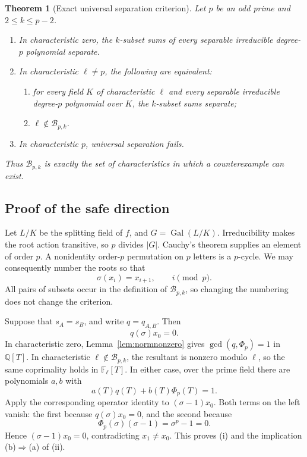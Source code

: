 \documentclass[11pt,a4paper]{article}
\newtheorem{theorem}{Theorem}[section]
\theoremstyle{definition}
\theoremstyle{remark}
\newcommand{\Q}{\mathbb Q}
\newcommand{\F}{\mathbb F}
\newcommand{\Gal}{\operatorname{Gal}}
\begin{document}
\begin{theorem}[Exact universal separation criterion]\label{thm:bad}
Let $p$ be an odd prime and $2\leq k\leq p-2$.
\begin{enumerate}[label=(\roman*)]
\item In characteristic zero, the $k$-subset sums of every separable
irreducible degree-$p$ polynomial separate.
\item In characteristic $\ell\neq p$, the following are equivalent:
\begin{enumerate}[label=(\alph*)]
\item for every field $K$ of characteristic $\ell$ and every separable
irreducible degree-$p$ polynomial over $K$, the $k$-subset sums separate;
\item $\ell\notin\mathcal B_{p,k}$.
\end{enumerate}
\item In characteristic $p$, universal separation fails.
\end{enumerate}
Thus $\mathcal B_{p,k}$ is exactly the set of characteristics in which a
counterexample can exist.
\end{theorem}

\subsection{Proof of the safe direction}

Let $L/K$ be the splitting field of $f$, and $G=\Gal(L/K)$. Irreducibility
makes the root action transitive, so $p$ divides $|G|$. Cauchy's theorem
supplies an element of order $p$. A nonidentity order-$p$ permutation on
$p$ letters is a $p$-cycle. We may consequently number the roots so that
\[
 \sigma(x_i)=x_{i+1},\qquad i\pmod p.
\]
All pairs of subsets occur in the definition of $\mathcal B_{p,k}$, so
changing the numbering does not change the criterion.

Suppose that $s_A=s_B$, and write $q=q_{A,B}$. Then
\[
 q(\sigma)x_0=0.
\]
In characteristic zero, Lemma~\ref{lem:normnonzero} gives
$\gcd(q,\Phi_p)=1$ in $\Q[T]$. In characteristic
$\ell\notin\mathcal B_{p,k}$, the resultant is nonzero modulo $\ell$, so
the same coprimality holds in $\F_\ell[T]$. In either case, over the prime
field there are polynomials $a,b$ with
\[
 a(T)q(T)+b(T)\Phi_p(T)=1.
\]
Apply the corresponding operator identity to $(\sigma-1)x_0$. Both terms
on the left vanish: the first because $q(\sigma)x_0=0$, and the second
because
\[
 \Phi_p(\sigma)(\sigma-1)=\sigma^p-1=0.
\]
Hence $(\sigma-1)x_0=0$, contradicting $x_1\neq x_0$. This proves (i) and
the implication (b)$\Rightarrow$(a) of (ii).
\end{document}
